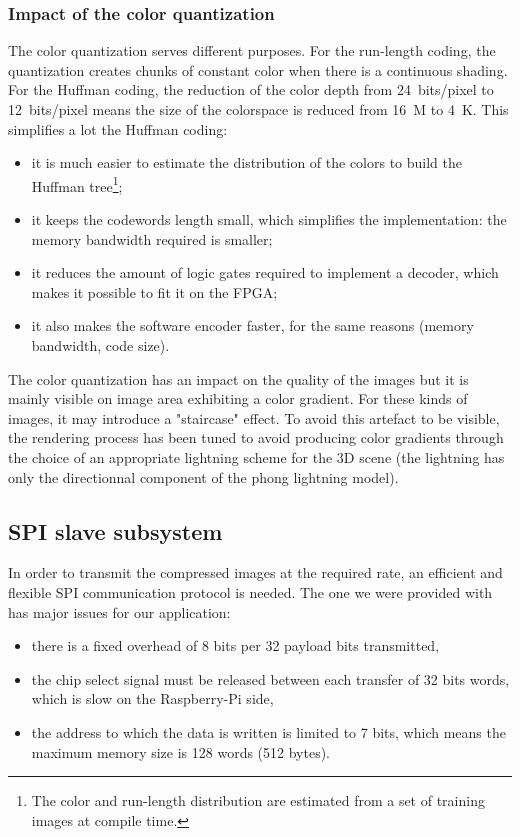 \documentclass[english, DIV=13]{scrartcl}
\begin{document}
\subsubsection{Impact of the color quantization}

The color quantization serves different purposes. For the run-length coding,
the quantization creates chunks of constant color when there is a
continuous shading. For the Huffman
coding, the reduction of the color depth from \SI{24}{bits/pixel} to
\SI{12}{bits/pixel} means the size of the colorspace is reduced from
\SI{16}{M} to \SI{4}{K}. This simplifies a lot the Huffman coding:
\begin{itemize}
    \item it is much easier to estimate the distribution of the colors
    to build the Huffman tree\footnote{The color and run-length distribution are
    estimated from a set of training images at compile time.};
    \item it keeps the codewords length small, which simplifies the implementation:
    the memory bandwidth required is smaller;
    \item it reduces the amount of logic gates required to implement a decoder,
    which makes it possible to fit it on the FPGA;
    \item it also makes the software encoder faster, for the same reasons
    (memory bandwidth, code size).
\end{itemize}

The color quantization has an impact on the quality of the images
but it is mainly visible on image area exhibiting a color gradient.
For these kinds of images,
it may introduce a "staircase" effect. To avoid this artefact to be visible,
the rendering process has been tuned to avoid producing color gradients
through the choice of an appropriate lightning scheme for the 3D scene (the lightning
has only the directionnal component of the phong lightning model).

\subsection{SPI slave subsystem}
\label{sec:spi}

In order to transmit the compressed images at the required rate, an efficient and
flexible SPI communication protocol is needed.
The one we were provided with has major issues for our application:
\begin{itemize}
    \item there is a fixed overhead of 8 bits per 32 payload bits transmitted,
    \item the chip select signal must be released between each transfer of 32 bits
        words, which is slow on the Raspberry-Pi side,
    \item the address to which the data is written is limited to 7 bits, which means
        the maximum memory size is 128 words (512 bytes).
\end{itemize}
\end{document}
